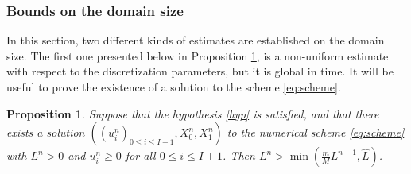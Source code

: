 \documentclass{amsart}
\newtheorem{proposition}[theorem]{Proposition}
\begin{document}
	\subsubsection{Bounds on the domain size}
	In this section, two different kinds of estimates are established on the domain size. The first one presented below in Proposition \ref{prop:Ln_bounds_non_unif}, is a non-uniform estimate with respect to the discretization parameters, but it is global in time. It will be useful to prove the existence of a solution to the scheme \eqref{eq:scheme}.
	\begin{proposition} \label{prop:Ln_bounds_non_unif}
		Suppose that the hypothesis \eqref{hyp} is satisfied, and that there exists a solution $((u_i^n)_{0 \leq i \leq I+1}, X_0^n, X_1^n)$ to the numerical scheme \eqref{eq:scheme} with $L^n > 0$  and $u_i^n\geq 0 $ for all $0\leq i\leq I+1$. Then $L^n > \min \left( \frac{m}{M} L^{n-1}, \hat{L} \right)$.
	\end{proposition}
\end{document}
